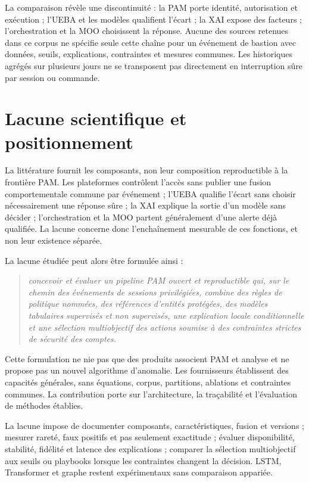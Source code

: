 \documentclass[11pt,a4paper,oneside]{report}
\theoremstyle{definition}
\theoremstyle{plain}
\begin{document}
La comparaison révèle une discontinuité : la PAM porte identité, autorisation et exécution ; l'UEBA et les modèles qualifient l'écart ; la XAI expose des facteurs ; l'orchestration et la MOO choisissent la réponse. Aucune des sources retenues dans ce corpus ne spécifie seule cette chaîne pour un événement de bastion avec données, seuils, explications, contraintes et mesures communes. Les historiques agrégés sur plusieurs jours ne se transposent pas directement en interruption sûre par session ou commande.

\section{Lacune scientifique et positionnement}
\label{sec:domain-gap}

La littérature fournit les composants, non leur composition reproductible à la frontière PAM. Les plateformes contrôlent l'accès sans publier une fusion comportementale commune par événement ; l'UEBA qualifie l'écart sans choisir nécessairement une réponse sûre ; la XAI explique la sortie d'un modèle sans décider ; l'orchestration et la MOO partent généralement d'une alerte déjà qualifiée. La lacune concerne donc l'enchaînement mesurable de ces fonctions, et non leur existence séparée.

La lacune étudiée peut alors être formulée ainsi :
\begin{quote}
\emph{concevoir et évaluer un pipeline PAM ouvert et reproductible qui, sur le chemin des événements de sessions privilégiées, combine des règles de politique nommées, des références d'entités protégées, des modèles tabulaires supervisés et non supervisés, une explication locale conditionnelle et une sélection multiobjectif des actions soumise à des contraintes strictes de sécurité des comptes.}
\end{quote}

Cette formulation ne nie pas que des produits associent PAM et analyse et ne propose pas un nouvel algorithme d'anomalie. Les fournisseurs établissent des capacités générales, sans équations, corpus, partitions, ablations et contraintes communes. La contribution porte sur l'architecture, la traçabilité et l'évaluation de méthodes établies.

La lacune impose de documenter composants, caractéristiques, fusion et versions ; mesurer rareté, faux positifs et pas seulement exactitude ; évaluer disponibilité, stabilité, fidélité et latence des explications ; comparer la sélection multiobjectif aux seuils ou playbooks lorsque les contraintes changent la décision. LSTM, Transformer et graphe restent expérimentaux sans comparaison appariée.
\end{document}
